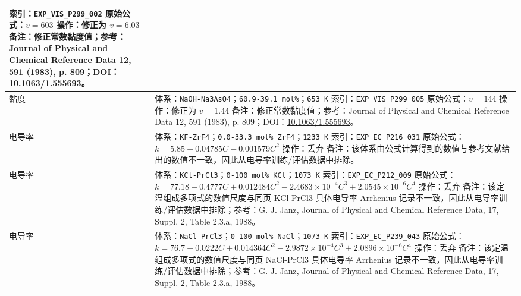 \documentclass[12pt]{article}
\providecommand{\passthrough}[1]{#1}
\begin{document}
{\begin{longtable}[]{@{}
  >{\raggedright\arraybackslash}p{}
  >{\raggedright\arraybackslash}p{}@{}}
索引：\passthrough{\lstinline!EXP_VIS_P299_002!}\newline
原始公式：\(v = 603\)\newline
操作：修正为 \(v = 6.03\)\newline
备注：修正常数黏度值；参考：Journal of Physical and Chemical Reference Data 12, 591 (1983), p. 809；DOI：\href{https://doi.org/10.1063/1.555693}{10.1063/1.555693}。 \\
\midrule
黏度 & 体系：\passthrough{\lstinline!NaOH-Na3AsO4!}；\texttt{60.9-39.1 mol\%}；\passthrough{\lstinline!653 K!}\newline
索引：\passthrough{\lstinline!EXP_VIS_P299_005!}\newline
原始公式：\(v = 144\)\newline
操作：修正为 \(v = 1.44\)\newline
备注：修正常数黏度值；参考：Journal of Physical and Chemical Reference Data 12, 591 (1983), p. 809；DOI：\href{https://doi.org/10.1063/1.555693}{10.1063/1.555693}。 \\
\midrule
电导率 & 体系：\passthrough{\lstinline!KF-ZrF4!}；\texttt{0.0-33.3 mol\% ZrF4}；\passthrough{\lstinline!1233 K!}\newline
索引：\passthrough{\lstinline!EXP_EC_P216_031!}\newline
原始公式：\(k = 5.85 - 0.04785 C - 0.001579 C^2\)\newline
操作：丢弃\newline
备注：该体系由公式计算得到的数值与参考文献给出的数值不一致，因此从电导率训练/评估数据中排除。 \\
\midrule
电导率 & 体系：\passthrough{\lstinline!KCl-PrCl3!}；\texttt{0-100 mol\% KCl}；\passthrough{\lstinline!1073 K!}\newline
索引：\passthrough{\lstinline!EXP_EC_P212_009!}\newline
原始公式：\(k = 77.18 - 0.4777 C + 0.012484 C^2 - 2.4683 \times 10^{-4} C^3 + 2.0545 \times 10^{-6} C^4\)\newline
操作：丢弃\newline
备注：该定温组成多项式的数值尺度与同页 KCl-PrCl3 具体电导率 Arrhenius 记录不一致，因此从电导率训练/评估数据中排除；参考：G. J. Janz, Journal of Physical and Chemical Reference Data, 17, Suppl. 2, Table 2.3.a, 1988。 \\
\midrule
电导率 & 体系：\passthrough{\lstinline!NaCl-PrCl3!}；\texttt{0-100 mol\% NaCl}；\passthrough{\lstinline!1073 K!}\newline
索引：\passthrough{\lstinline!EXP_EC_P239_043!}\newline
原始公式：\(k = 76.7 + 0.0222 C + 0.014364 C^2 - 2.9872 \times 10^{-4} C^3 + 2.0896 \times 10^{-6} C^4\)\newline
操作：丢弃\newline
备注：该定温组成多项式的数值尺度与同页 NaCl-PrCl3 具体电导率 Arrhenius 记录不一致，因此从电导率训练/评估数据中排除；参考：G. J. Janz, Journal of Physical and Chemical Reference Data, 17, Suppl. 2, Table 2.3.a, 1988。 \\
\end{longtable}
}
\end{document}

